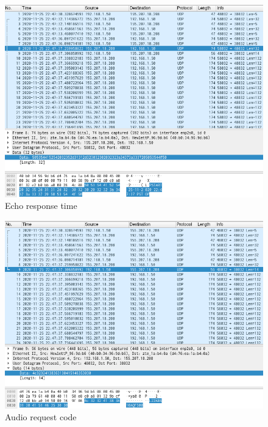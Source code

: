 \documentclass[12pt, a4paper]{article}
\begin{document}
\pagebreak
\begin{figure}[h!]
\centering
	\includegraphics[height=.4\textheight, width=\textwidth, keepaspectratio]{assets/wireshark/audio2.png}
	\caption{Echo response time} 
\end{figure}

\begin{figure}[h!]
\centering
	\includegraphics[height=.4\textheight, width=\textwidth, keepaspectratio]{assets/wireshark/audio3.png}
	\caption{Audio request code} 
\end{figure}
\end{document}
